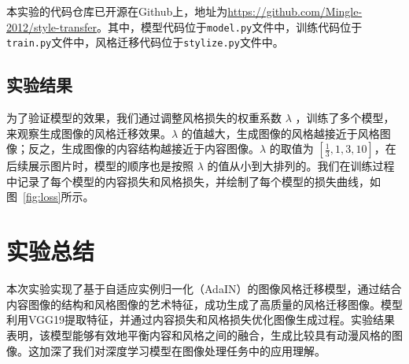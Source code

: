 \documentclass[UTF8,openany]{ctexbook}
\begin{document}
本实验的代码仓库已开源在Github上，地址为\url{https://github.com/Mingle-2012/style-transfer}。其中，模型代码位于\texttt{model.py}文件中，训练代码位于\texttt{train.py}文件中，风格迁移代码位于\texttt{stylize.py}文件中。

\section{实验结果}

为了验证模型的效果，我们通过调整风格损失的权重系数 $\lambda$ ，训练了多个模型，来观察生成图像的风格迁移效果。$\lambda$ 的值越大，生成图像的风格越接近于风格图像；反之，生成图像的内容结构越接近于内容图像。$\lambda$ 的取值为 $[\frac{1}{3}, 1, 3, 10]$，在后续展示图片时，模型的顺序也是按照 $\lambda$ 的值从小到大排列的。我们在训练过程中记录了每个模型的内容损失和风格损失，并绘制了每个模型的损失曲线，如图~\ref{fig:loss}所示。





\chapter{实验总结}

本次实验实现了基于自适应实例归一化（AdaIN）的图像风格迁移模型，通过结合内容图像的结构和风格图像的艺术特征，成功生成了高质量的风格迁移图像。模型利用VGG19提取特征，并通过内容损失和风格损失优化图像生成过程。实验结果表明，该模型能够有效地平衡内容和风格之间的融合，生成比较具有动漫风格的图像。这加深了我们对深度学习模型在图像处理任务中的应用理解。



\end{document}
